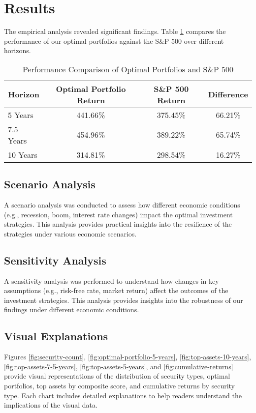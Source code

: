 \section{Results}
The empirical analysis revealed significant findings. Table \ref{performance-comparison} compares the performance of our optimal portfolios against the S\&P 500 over different horizons.

\begin{table}[h!]
\centering
\begin{tabular}{lccc}
\hline
Horizon & Optimal Portfolio Return & S\&P 500 Return & Difference \\
\hline
5 Years & 441.66\% & 375.45\% & 66.21\% \\
7.5 Years & 454.96\% & 389.22\% & 65.74\% \\
10 Years & 314.81\% & 298.54\% & 16.27\% \\
\hline
\end{tabular}
\caption{Performance Comparison of Optimal Portfolios and S\&P 500}
\label{performance-comparison}
\end{table}

\subsection{Scenario Analysis}
A scenario analysis was conducted to assess how different economic conditions (e.g., recession, boom, interest rate changes) impact the optimal investment strategies. This analysis provides practical insights into the resilience of the strategies under various economic scenarios.

\subsection{Sensitivity Analysis}
A sensitivity analysis was performed to understand how changes in key assumptions (e.g., risk-free rate, market return) affect the outcomes of the investment strategies. This analysis provides insights into the robustness of our findings under different economic conditions.

\subsection{Visual Explanations}
Figures \ref{fig:security-count}, \ref{fig:optimal-portfolio-5-years}, \ref{fig:top-assets-10-years}, \ref{fig:top-assets-7-5-years}, \ref{fig:top-assets-5-years}, and \ref{fig:cumulative-returns} provide visual representations of the distribution of security types, optimal portfolios, top assets by composite score, and cumulative returns by security type. Each chart includes detailed explanations to help readers understand the implications of the visual data.

